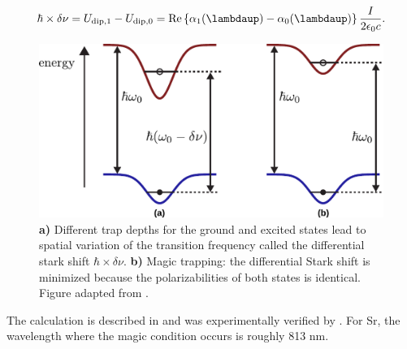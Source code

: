 \begin{equation}\label{eq:DifferentialStarkShift}
    \hbar \times \delta \nu = U_{\text{dip},1} - U_{\text{dip},0} = 
    \operatorname{Re}\left\{\alpha_1(\lambdaup)-\alpha_0(\lambdaup)\right\} \frac{I}{2 \epsilon_0 c}.
\end{equation}
\begin{figure}
    \centering
    \includegraphics[width=0.68\linewidth]{figures/MagicTrapping.pdf}
    \caption{\textsf{\textbf{a)}} Different trap depths for the ground and excited states lead to spatial variation of the transition frequency called the differential stark shift $\hbar \times \delta \nu$.
    \textsf{\textbf{b)}} Magic trapping: the differential Stark shift is minimized because the polarizabilities of both states is identical.
    Figure adapted from \cite{Lundblad2010}.}
    \label{fig:MagicTrapping}
\end{figure}
The calculation is described in \cite{Madjarov2020,Boyd2007} and was experimentally verified by \cite{Takamoto2005}.
For Sr, the wavelength where the magic condition occurs is roughly 813 nm. 






	

